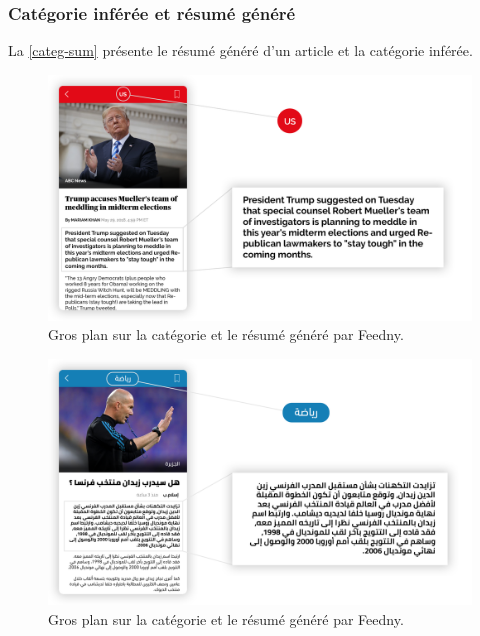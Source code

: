 \subsubsection{Catégorie inférée et résumé généré}
La \autoref{categ-sum} présente le résumé généré d'un article et la catégorie inférée.
\begin{figure}[H]
    \centering
    \includegraphics[width=410pt]{img/chapter4/feedny/en-summary.png}
    \caption{Gros plan sur la catégorie et le résumé généré par \textquotedbl Feedny\textquotedbl.}
    \label{categ-sum}
\end{figure}

\begin{figure}[H]
    \centering
    \includegraphics[width=410pt]{img/chapter4/feedny/ar-summary.png}
    \caption{Gros plan sur la catégorie et le résumé généré par \textquotedbl Feedny\textquotedbl.}
    \label{categ-sum}
\end{figure}


